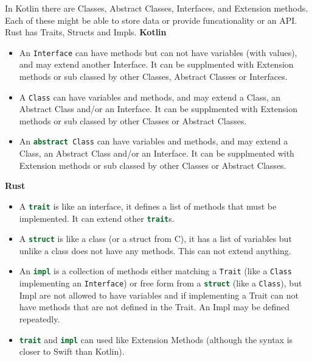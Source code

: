 \documentclass[a4paper,11pt]{article}
\begin{document}
In Kotlin there are Classes, Abstract Classes, Interfaces, and Extension methods. Each of these might be able to store data or provide funcationality or an API.
Rust has Traits, Structs and Impls.
\newline
\textbf{Kotlin}
\begin{itemize}
  \item An \lstinline[language=Kotlin]{Interface} can have methods but can not have variables (with values), and may extend another Interface. It can be supplmented with Extension methods or sub classed by other Classes, Abstract Classes or Interfaces.
  \item A \lstinline[language=Kotlin]{Class} can have variables and methods, and may extend a Class, an Abstract Class and/or an Interface. It can be supplmented with Extension methods or sub classed by other Classes or Abstract Classes.
  \item An \lstinline[language=Kotlin]{abstract Class} can have variables and methods, and may extend a Class, an Abstract Class and/or an Interface. It can be supplmented with Extension methods or sub classed by other Classes or Abstract Classes.
\end{itemize}
\textbf{Rust}
\begin{itemize}
  \item A \lstinline[language=Rust]{trait} is like an interface, it defines a list of methods that must be implemented. It can extend other \lstinline[language=Rust]{trait}s.
  \item A \lstinline[language=Rust]{struct} is like a class (or a struct from C), it has a list of variables but unlike a class does not have any methods. This can not extend anything.
  \item An \lstinline[language=Rust]{impl} is a collection of methods either matching a \lstinline[language=Rust]{Trait} (like a \lstinline[language=Kotlin]{Class} implementing an \lstinline[language=Kotlin]{Interface}) or free form from a \lstinline[language=Rust]{struct} (like a \lstinline[language=Kotlin]{Class}), but Impl are not allowed to have variables and if implementing a Trait can not have methods that are not defined in the Trait. An Impl may be defined repeatedly.
  \item \lstinline[language=Rust]{trait} and \lstinline[language=Rust]{impl} can used like Extension Methods (although the syntax is closer to Swift than Kotlin).
\end{itemize}
\end{document}
